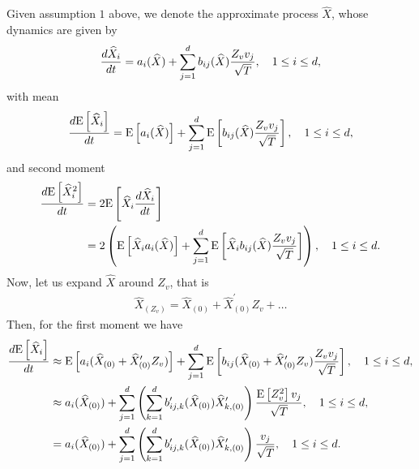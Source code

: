 Given assumption $1$ above, we denote the approximate process $\hat{X}$, whose dynamics are given by
\begin{align}\label{eq:approximate_dynamics}
\frac{d\widehat{X}_i}{dt}=a_i(\widehat{X})+\sum_{j=1}^d b_{ij}(\widehat{X})  \frac{Z_v v_j}{\sqrt{T}}, \quad 1 \le i \le d ,
\end{align}
with mean 
\begin{equation*}
\frac{d\mathrm{E}\left[\widehat{X}_i\right]}{dt}=\mathrm{E}\left[a_i(\widehat{X})\right]+\sum_{j=1}^d \mathrm{E}\left[b_{ij}(\widehat{X})  \frac{Z_v v_j}{\sqrt{T}}\right], \quad 1 \le i \le d ,
\end{equation*}
and second moment
\begin{align*}
\frac{d\mathrm{E}\left[\widehat{X}^2_i\right]}{dt}&=2 \mathrm{E}\left[\widehat{X}_i \frac{d\widehat{X}_i}{dt}\right]\nonumber\\
&=2 \left(\mathrm{E}\left[\widehat{X}_i a_i(\widehat{X})\right]+\sum_{j=1}^d \mathrm{E}\left[ \widehat{X}_i b_{ij}(\widehat{X})  \frac{Z_v v_j}{\sqrt{T}}\right]\right), \quad 1 \le i \le d .
\end{align*}
Now, let us expand $\hat{X}$ around $Z_v$, that is
\begin{align}
\hat{X}_{(Z_v)}=\hat{X}_{(0)}+\hat{X}^\prime_{(0)} Z_v+\dots
\end{align}
Then, for the first moment we have
\begin{align}\label{eq:first_moment_approximation}
\frac{d\mathrm{E}\left[\widehat{X}_i\right]}{dt}&\approx \mathrm{E}\left[a_i(\widehat{X}_{(0)}+\widehat{X}^\prime_{(0)} Z_v)\right]+\sum_{j=1}^d \mathrm{E}\left[b_{ij}(\widehat{X}_{(0)}+\widehat{X}^\prime_{(0)} Z_v)  \frac{Z_v v_j}{\sqrt{T}}\right], \quad 1 \le i \le d, \nonumber\\ 
&\approx a_i(\widehat{X}_{(0)})+\sum_{j=1}^d \left(\sum_{k=1}^d  b_{ij,k}^\prime(\widehat{X}_{(0)}) \widehat{X}_{k,(0)}^\prime\right) \frac{\mathrm{E}\left[Z_v^2\right] v_j}{\sqrt{T}}, \quad 1 \le i \le d,\nonumber\\ 
&= a_i(\widehat{X}_{(0)})+\sum_{j=1}^d \left(\sum_{k=1}^d  b_{ij,k}^\prime(\widehat{X}_{(0)}) \widehat{X}_{k,(0)}^\prime \right) \frac{v_j}{\sqrt{T}}, \quad 1 \le i \le d.
\end{align} 

